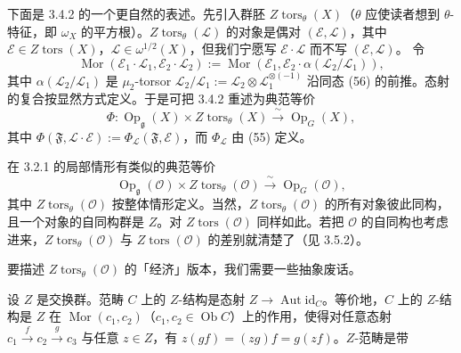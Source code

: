  下面是 3.4.2 的一个更自然的表述。先引入群胚 $Z\operatorname{tors}_{\theta}(X)$（$\theta$ 应使读者想到 $\theta$-特征，即 $\omega_{X}$ 的平方根）。$Z\operatorname{tors}_{\theta}(\mathcal{L})$ 的对象是偶对 $(\mathcal{E},\mathcal{L})$，其中 $\mathcal{E}\in Z\operatorname{tors}(X)$，$\mathcal{L}\in\omega^{1/2}(X)$，但我们宁愿写 $\mathcal{E}\cdot\mathcal{L}$ 而不写 $(\mathcal{E},\mathcal{L})$。
令
\[
  \operatorname{Mor}(\mathcal{E}_{1}\cdot\mathcal{L}_{1},\mathcal{E}_{2}\cdot\mathcal{L}_{2})
  :=\operatorname{Mor}(\mathcal{E}_{1},\mathcal{E}_{2}\cdot\alpha(\mathcal{L}_{2}/\mathcal{L}_{1})),
\]
其中 $\alpha(\mathcal{L}_{2}/\mathcal{L}_{1})$ 是 $\mu_{2}$-torsor $\mathcal{L}_{2}/\mathcal{L}_{1}:=\mathcal{L}_{2}\otimes\mathcal{L}_{1}^{\otimes(-1)}$ 沿同态 (56) 的前推。态射的复合按显然方式定义。于是可把 3.4.2 重述为典范等价
\begin{equation}\tag{57}
  \Phi : \operatorname{Op}_{\mathfrak{g}}(X)\times Z\operatorname{tors}_{\theta}(X)\xrightarrow{\ \sim\ }\operatorname{Op}_{G}(X),
\end{equation}
其中 $\Phi(\mathfrak{F},\mathcal{L}\cdot\mathcal{E}):=\Phi_{\mathcal{L}}(\mathfrak{F},\mathcal{E})$，而 $\Phi_{\mathcal{L}}$ 由 (55) 定义。

在 3.2.1 的局部情形有类似的典范等价
\begin{equation}\tag{58}
  \operatorname{Op}_{\mathfrak{g}}(\mathcal{O})\times Z\operatorname{tors}_{\theta}(\mathcal{O})\xrightarrow{\ \sim\ }\operatorname{Op}_{G}(\mathcal{O}),
\end{equation}
其中 $Z\operatorname{tors}_{\theta}(\mathcal{O})$ 按整体情形定义。当然，$Z\operatorname{tors}_{\theta}(\mathcal{O})$ 的所有对象彼此同构，且一个对象的自同构群是 $Z$。对 $Z\operatorname{tors}(\mathcal{O})$ 同样如此。若把 $\mathcal{O}$ 的自同构也考虑进来，$Z\operatorname{tors}_{\theta}(\mathcal{O})$ 与 $Z\operatorname{tors}(\mathcal{O})$ 的差别就清楚了（见 3.5.2）。

 要描述 $Z\operatorname{tors}_{\theta}(\mathcal{O})$ 的「经济」版本，我们需要一些抽象废话。

设 $Z$ 是交换群。范畴 $C$ 上的 $Z$-结构是态射 $Z\to\operatorname{Aut}\mathrm{id}_{C}$。等价地，$C$ 上的 $Z$-结构是 $Z$ 在 $\operatorname{Mor}(c_{1},c_{2})$（$c_{1},c_{2}\in\operatorname{Ob}C$）上的作用，使得对任意态射 $c_{1}\xrightarrow{f}c_{2}\xrightarrow{g}c_{3}$ 与任意 $z\in Z$，有 $z(gf)=(zg)f=g(zf)$。$Z$-范畴是带

